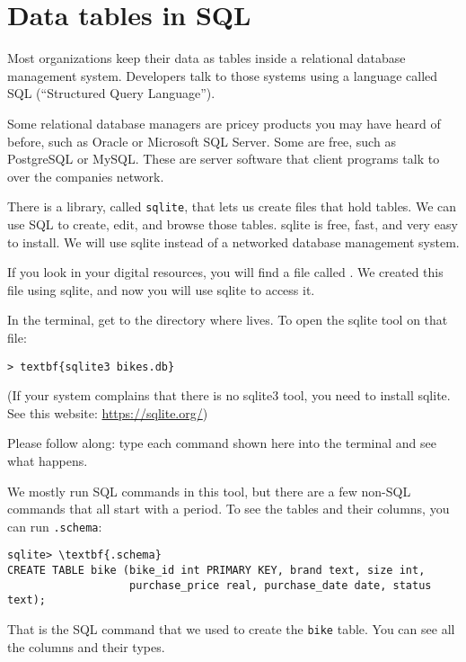 \chapter{Data tables in SQL}

Most organizations keep their data as tables inside a relational
database management system. Developers talk to those systems using a
language called SQL (``Structured Query Language'').

Some relational database managers are pricey products you may have
heard of before, such as Oracle or Microsoft SQL Server. Some are free, such as
PostgreSQL or MySQL.  These are server software that client programs
talk to over the companies network.

There is a library, called \texttt{sqlite}, that lets us create files that hold
tables. We can use SQL to create, edit, and browse those tables.
sqlite is free, fast, and very easy to install.  We will use sqlite
instead of a networked database management system.

If you look in your digital resources, you will find a file called
. We created this file using sqlite, and now you
will use sqlite to access it.

In the terminal, get to the directory where  lives. To open the sqlite tool on that file:

\begin{Verbatim}[commandchars=\\\{\}]
> textbf{sqlite3 bikes.db}
\end{Verbatim}

(If your system complains that there is no sqlite3 tool, you need to install sqlite. See this website: \url{https://sqlite.org/})

Please follow along: type each command shown here into the terminal
and see what happens.

We mostly run SQL commands in this tool, but there are a few non-SQL
 commands that all start with a period.  To see the tables and their
 columns, you can run \texttt{.schema}:

\begin{Verbatim}[commandchars=\\\{\}]
sqlite> \textbf{.schema}
CREATE TABLE bike (bike_id int PRIMARY KEY, brand text, size int,
                   purchase_price real, purchase_date date, status text);
\end{Verbatim}

That is the SQL command that we used to create the \texttt{bike}
table. You can see all the columns and their types.

